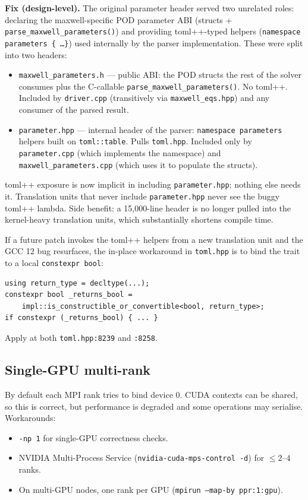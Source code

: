 \documentclass[11pt]{article}
\begin{document}
\textbf{Fix (design-level).}  The original parameter header served
two unrelated roles: declaring the maxwell-specific POD parameter
ABI (structs + \texttt{parse\_maxwell\_parameters()}) and
providing toml++-typed helpers
(\texttt{namespace parameters \{ \ldots \}}) used internally by the
parser implementation.  These were split into two headers:
\begin{itemize}[itemsep=2pt,topsep=2pt]
  \item \texttt{maxwell\_parameters.h} --- public ABI: the POD
        structs the rest of the solver consumes plus the
        C-callable \texttt{parse\_maxwell\_parameters()}.  No
        toml++.  Included by \texttt{driver.cpp} (transitively
        via \texttt{maxwell\_eqs.hpp}) and any consumer of the
        parsed result.
  \item \texttt{parameter.hpp} --- internal header of the parser:
        \texttt{namespace parameters} helpers built on
        \texttt{toml::table}.  Pulls \texttt{toml.hpp}.  Included
        only by \texttt{parameter.cpp} (which implements the
        namespace) and \texttt{maxwell\_parameters.cpp} (which uses
        it to populate the structs).
\end{itemize}
toml++ exposure is now implicit in including
\texttt{parameter.hpp}; nothing else needs it.  Translation units
that never include \texttt{parameter.hpp} never see the buggy
toml++ lambda.  Side benefit: a 15{,}000-line header is no longer
pulled into the kernel-heavy translation units, which
substantially shortens compile time.

If a future patch invokes the toml++ helpers from a new
translation unit and the GCC 12 bug resurfaces, the in-place
workaround in \texttt{toml.hpp} is to bind the trait to a local
\texttt{constexpr bool}:
\begin{lstlisting}[style=cpp]
using return_type = decltype(...);
constexpr bool _returns_bool =
    impl::is_constructible_or_convertible<bool, return_type>;
if constexpr (_returns_bool) { ... }
\end{lstlisting}
Apply at both \texttt{toml.hpp:8239} and \texttt{:8258}.

\subsection{Single-GPU multi-rank}

By default each MPI rank tries to bind device 0.  CUDA contexts
can be shared, so this is correct, but performance is degraded
and some operations may serialise.  Workarounds:
\begin{itemize}[itemsep=2pt,topsep=2pt]
  \item \texttt{-np 1} for single-GPU correctness checks.
  \item NVIDIA Multi-Process Service
        (\texttt{nvidia-cuda-mps-control -d}) for $\leq 2$--$4$
        ranks.
  \item On multi-GPU nodes, one rank per GPU
        (\texttt{mpirun --map-by ppr:1:gpu}).
\end{itemize}
\end{document}
